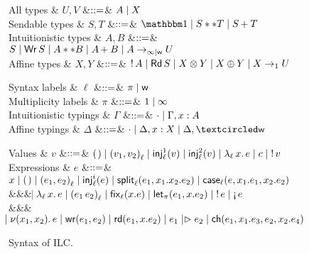 \begin{figure*}[t]
  \centering
  \begin{minipage}{.58\textwidth}
    \centering
    \begin{grammar}
        All types
      & $U, V$
        &$\bnfas$& $A \bnfalt X$
      \\
      Sendable types
      & $S, T$
      &$\bnfas$& $\tyUnit \bnfalt S ** T \bnfalt \tySum{S}{}{T}$
      \\
      Intuitionistic types
      & $A,B$
      &$\bnfas$& $S \bnfalt \tyWr{S} \bnfalt A ** B \bnfalt \tySum{A}{}{B}
      \bnfalt \tyArr{A}{\infty \mid \wm}{U}$
      \\
      Affine types
      & $X,Y$
      &$\bnfas$& $\tyBang{A} \bnfalt \tyRd{S} \bnfalt \tyTensor{X}{Y} \bnfalt
      \tyOplus{X}{Y} \bnfalt \tyArr{X}{1}{U}$
    \end{grammar}      
  \end{minipage}%
  \begin{minipage}{.42\textwidth}
    \centering
    \begin{grammar}
      Syntax labels
      & $\ell$
      &$\bnfas$& $\pi \bnfalt \wm$      
      \\      
      Multiplicity labels
      & $\pi$
      &$\bnfas$& $1 \bnfalt \infty$      
      \\
      Intuitionistic typings
      & $\Gamma$
      &$\bnfas$& $\emptyctxt \bnfalt \Gamma,x:A$
      \\
      Affine typings
      & $\Delta$
      &$\bnfas$& $\emptyctxt \bnfalt \Delta,x:X \bnfalt \Delta, \wrtok$
    \end{grammar}    
  \end{minipage}
  \begin{grammar}
    Values
    & $v$
    &$\bnfas$&
    $\eUnit \bnfalt \ePair{v_1}{v_2}{\ell} \bnfalt \eInjj{\ell}{1}{v} \bnfalt
    \eInjj{\ell}{2}{v} \bnfalt \eLamm{\ell}{x}{e} \bnfalt c \bnfalt \eBang{v}$
    \\
    Expressions
    & $e$
    &$\bnfas$&
    $\eVar{x} \bnfalt \eUnit \bnfalt \ePair{e_1}{e_2}{\ell} \bnfalt \eInjj{\ell}{i}{e}
    \bnfalt \eSplitt{\ell}{e_1}{x_1}{x_2}{e_2} \bnfalt
    \eCase{\ell}{e}{x_1}{e_1}{x_2}{e_2}$
    \\ &&& $\bnfaltbrk \eLamm{\ell}{x}{e} \bnfalt \eApp{e_1}{e_2}{\ell} \bnfalt \eFixx{\ell}{x}{e}
    \bnfalt \eLet{x}{e_1}{e_2} \bnfalt \eBang{e} \bnfalt \eUnbang{e}$
    \\ &&& $\bnfaltbrk \eNu{(x_1,x_2)}{e} \bnfalt \eWr{e_1}{e_2} \bnfalt
    \eLetRd{e_1}{x}{e_2} \bnfalt \eFork{e_1}{e_2} \bnfalt
    \eChoicee{e_1}{x_1}{e_3}{e_2}{x_2}{e_4}$
  \end{grammar}      
  \caption{Syntax of ILC.}
  \label{fig:ilc-syntax}
\end{figure*}
